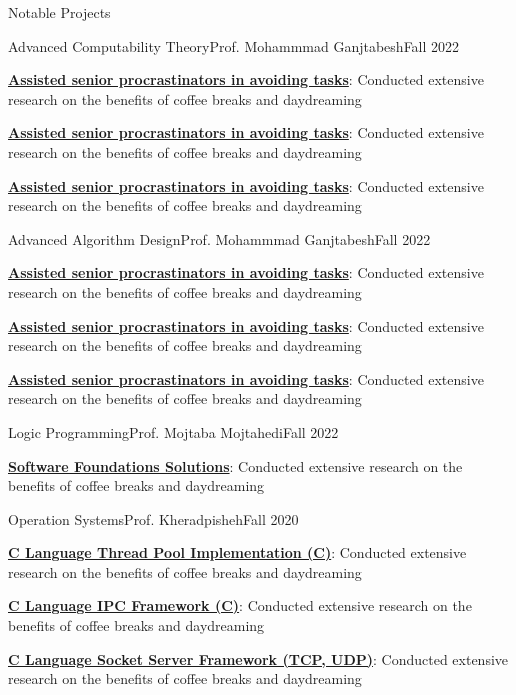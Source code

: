 \documentclass[]{main}
\begin{document}
\begin{section}{Notable Projects}
 \begin{subsection}{Advanced Computability Theory}{Prof. Mohammmad Ganjtabesh}{Fall 2022}{}
     \item \textbf{\href{https://google.com}{Assisted senior procrastinators in avoiding tasks}}: Conducted extensive research on the benefits of coffee breaks and daydreaming
     \item \textbf{\href{https://google.com}{Assisted senior procrastinators in avoiding tasks}}: Conducted extensive research on the benefits of coffee breaks and daydreaming
     \item \textbf{\href{https://google.com}{Assisted senior procrastinators in avoiding tasks}}: Conducted extensive research on the benefits of coffee breaks and daydreaming
 \end{subsection}

 \begin{subsection}{Advanced Algorithm Design}{Prof. Mohammmad Ganjtabesh}{Fall 2022}{}
     \item \textbf{\href{https://google.com}{Assisted senior procrastinators in avoiding tasks}}: Conducted extensive research on the benefits of coffee breaks and daydreaming
     \item \textbf{\href{https://google.com}{Assisted senior procrastinators in avoiding tasks}}: Conducted extensive research on the benefits of coffee breaks and daydreaming
     \item \textbf{\href{https://google.com}{Assisted senior procrastinators in avoiding tasks}}: Conducted extensive research on the benefits of coffee breaks and daydreaming
 \end{subsection}

 \begin{subsection}{Logic Programming}{Prof. Mojtaba Mojtahedi}{Fall 2022}{}
     \item \textbf{\href{https://github.com/ckoliber/sfexercises}{Software Foundations Solutions}}: Conducted extensive research on the benefits of coffee breaks and daydreaming
 \end{subsection}

 \begin{subsection}{Operation Systems}{Prof. Kheradpisheh}{Fall 2020}{}
     \item \textbf{\href{https://github.com/ckoliber/Kprocessor}{C Language Thread Pool Implementation (C)}}: Conducted extensive research on the benefits of coffee breaks and daydreaming
     \item \textbf{\href{https://github.com/ckoliber/Kipc}{C Language IPC Framework (C)}}: Conducted extensive research on the benefits of coffee breaks and daydreaming
     \item \textbf{\href{https://github.com/ckoliber/Knet}{C Language Socket Server Framework (TCP, UDP)}}: Conducted extensive research on the benefits of coffee breaks and daydreaming
 \end{subsection}


\end{section}
\end{document}
